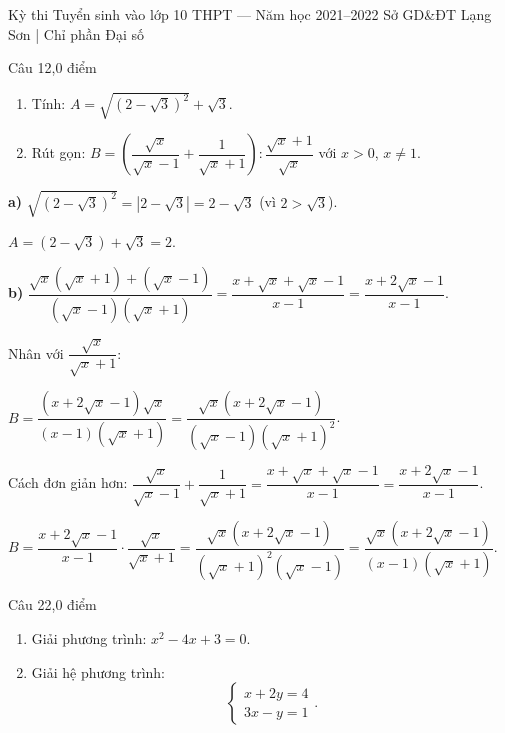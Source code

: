 ﻿%
%
  {Kỳ thi Tuyển sinh vào lớp 10 THPT — Năm học 2021--2022}%
  {Sở GD\&ĐT Lạng Sơn | Chỉ phần Đại số}

\begin{de_cau}{Câu 1}{2,0 điểm}
\begin{enumerate}[label=\alph*)]
  \item Tính: $A = \sqrt{(2-\sqrt{3})^2}+\sqrt{3}$.
  \item Rút gọn: $B = \left(\dfrac{\sqrt{x}}{\sqrt{x}-1}+\dfrac{1}{\sqrt{x}+1}\right):\dfrac{\sqrt{x}+1}{\sqrt{x}}$ với $x>0$, $x\neq1$.
\end{enumerate}
\end{de_cau}

\begin{loi_giai_cau}
\textbf{a)} $\sqrt{(2-\sqrt{3})^2}=|2-\sqrt{3}|=2-\sqrt{3}$ (vì $2>\sqrt{3}$).

$A=(2-\sqrt{3})+\sqrt{3}=\boxed{2}$.

\textbf{b)} $\dfrac{\sqrt{x}(\sqrt{x}+1)+(\sqrt{x}-1)}{(\sqrt{x}-1)(\sqrt{x}+1)}=\dfrac{x+\sqrt{x}+\sqrt{x}-1}{x-1}=\dfrac{x+2\sqrt{x}-1}{x-1}$.

Nhân với $\dfrac{\sqrt{x}}{\sqrt{x}+1}$:

$B=\dfrac{(x+2\sqrt{x}-1)\sqrt{x}}{(x-1)(\sqrt{x}+1)}=\dfrac{\sqrt{x}(x+2\sqrt{x}-1)}{(\sqrt{x}-1)(\sqrt{x}+1)^2}$.

Cách đơn giản hơn:
$\dfrac{\sqrt{x}}{\sqrt{x}-1}+\dfrac{1}{\sqrt{x}+1}=\dfrac{x+\sqrt{x}+\sqrt{x}-1}{x-1}=\dfrac{x+2\sqrt{x}-1}{x-1}$.

$B=\dfrac{x+2\sqrt{x}-1}{x-1}\cdot\dfrac{\sqrt{x}}{\sqrt{x}+1}=\dfrac{\sqrt{x}(x+2\sqrt{x}-1)}{(\sqrt{x}+1)^2(\sqrt{x}-1)}=\boxed{\dfrac{\sqrt{x}(x+2\sqrt{x}-1)}{(x-1)(\sqrt{x}+1)}}$.
\end{loi_giai_cau}

\begin{de_cau}{Câu 2}{2,0 điểm}
\begin{enumerate}[label=\alph*)]
  \item Giải phương trình: $x^2-4x+3=0$.
  \item Giải hệ phương trình:
  \[\begin{cases} x+2y=4 \\ 3x-y=1 \end{cases}.\]
\end{enumerate}
\end{de_cau}

